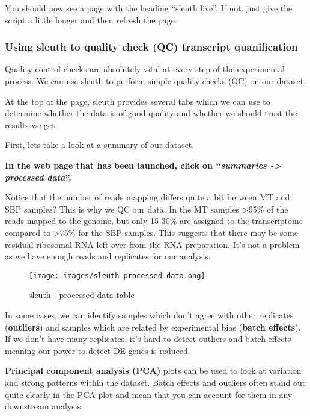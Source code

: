 \documentclass[11pt]{article}
\begin{document}
    You should now see a page with the heading ``sleuth live''. If not, just
give the script a little longer and then refresh the page.

    \hypertarget{using-sleuth-to-quality-check-qc-transcript-quanification}{%
\subsubsection{Using sleuth to quality check (QC) transcript
quanification}\label{using-sleuth-to-quality-check-qc-transcript-quanification}}

Quality control checks are absolutely vital at every step of the
experimental process. We can use sleuth to perform simple quality checks
(QC) on our dataset.

At the top of the page, sleuth provides several tabs which we can use to
determine whether the data is of good quality and whether we should
trust the results we get.

First, lets take a look at a summary of our dataset.

\textbf{In the web page that has been launched, click on
``\textit{summaries -\textgreater{} processed data}''.}

Notice that the number of reads mapping differs quite a bit between MT
and SBP samples? This is why we QC our data. In the MT samples
\textgreater95\% of the reads mapped to the genome, but only 15-30\% are
assigned to the transcriptome compared to \textgreater75\% for the SBP
samples. This suggests that there may be some residual ribosomal RNA
left over from the RNA preparation. It's not a problem as we have enough
reads and replicates for our analysis.

    \begin{figure}[!h]
\centering
\texttt{[image: images/sleuth-processed-data.png]}
\caption{sleuth - processed data table}
\end{figure}

    In some cases, we can identify samples which don't agree with other
replicates (\textbf{outliers}) and samples which are related by
experimental bias (\textbf{batch effects}). If we don't have many
replicates, it's hard to detect outliers and batch effects meaning our
power to detect DE genes is reduced.

\textbf{Principal component analysis (PCA)} plots can be used to look at
variation and strong patterns within the dataset. Batch effects and
outliers often stand out quite clearly in the PCA plot and mean that you
can account for them in any downstream analysis.
\end{document}
